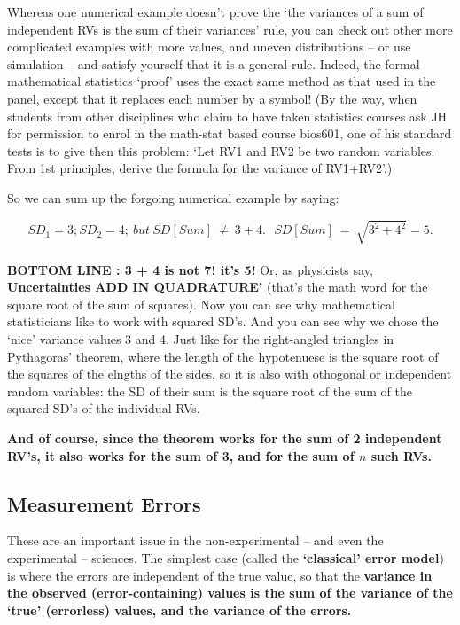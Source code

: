 \documentclass[]{book}
\begin{document}
Whereas one numerical example doesn't prove the `the variances of a sum of independent RVs is the sum of their variances' rule, you can check out other more complicated examples with more values, and uneven distributions -- or use simulation -- and satisfy yourself that it is a general rule. Indeed, the formal mathematical statistics `proof' uses the exact same method as that used in the panel, except that it replaces each number by a symbol! (By the way, when students from other disciplines who claim to have taken statistics courses ask JH for permission to enrol in the math-stat based course bios601, one of his standard tests is to give then this problem: `Let RV1 and RV2 be two random variables. From 1st principles, derive the formula for the variance of RV1+RV2'.)

So we can sum up the forgoing numerical example by saying:

\[ SD_1 = 3; SD_2 =4;\  but \ SD[Sum] \ \ne \ 3 + 4. \ \ \  SD[Sum] \ = \ \sqrt{3^2 + 4^2} = 5.\]\\
\textbf{BOTTOM LINE : 3 + 4 is not 7! it's 5! } Or, as physicists say, \textbf{Uncertainties ADD IN QUADRATURE'} (that's the math word for the square root of the sum of squares). Now you can see why mathematical statisticians like to work with squared SD's. And you can see why we chose the `nice' variance values 3 and 4. Just like for the right-angled triangles in Pythagoras' theorem, where the length of the hypotenuese is the square root of the squares of the elngths of the sides, so it is also with othogonal or independent random variables: the SD of their sum is the square root of the sum of the squared SD's of the individual RVs.

\textbf{And of course, since the theorem works for the sum of 2 independent RV's, it also works for the sum of 3, and for the sum of \(n\) such RVs.}

\hypertarget{measurement-errors}{%
\subsection{Measurement Errors}\label{measurement-errors}}

These are an important issue in the non-experimental -- and even the experimental -- sciences. The simplest case (called the \textbf{`classical' error model}) is where the errors are independent of the true value, so that the \textbf{variance in the observed (error-containing) values is the sum of the variance of the `true' (errorless) values, and the variance of the errors.}
\end{document}
